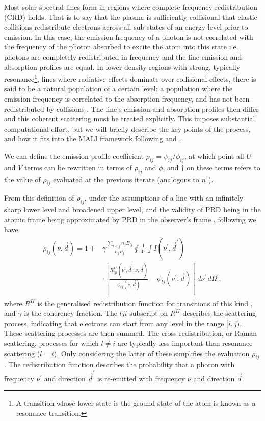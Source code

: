 Most solar spectral lines form in regions where complete frequency redistribution (CRD) holds.
That is to say that the plasma is sufficiently collisional that elastic collisions redistribute electrons across all sub-states of an energy level prior to emission.
In this case, the emission frequency of a photon is not correlated with the frequency of the photon absorbed to excite the atom into this state i.e. photons are completely redistributed in frequency and the line emission and absorption profiles are equal.
In lower density regions with strong, typically resonance\footnote{A transition whose lower state is the ground state of the atom is known as a resonance transition.}, lines where radiative effects dominate over collisional effects, there is said to be a natural population of a certain level: a population where the emission frequency is correlated to the absorption frequency, and has not been redistributed by collisions \citep{Hubeny2014}.
The line's emission and absorption profiles then differ and this coherent scattering must be treated explicitly.
This imposes substantial computational effort, but we will briefly describe the key points of the process, and how it fits into the MALI framework following \citet{Uitenbroek2001} and \citet{Hubeny2014}.

We can define the emission profile coefficient $\rho_{ij} = \psi_{ij} / \phi_{ij}$, at which point all $U$ and $V$ terms can be rewritten in terms of $\rho_{ij}$ and $\phi$, and $\dagger$ on these terms refers to the value of $\rho_{ij}$ evaluated at the previous iterate (analogous to $n^\dagger$).

From this definition of $\rho_{ij}$, under the assumptions of a line with an infinitely sharp lower level and broadened upper level, and the validity of PRD being in the atomic frame being approximated by PRD in the observer's frame \citep{Uitenbroek2001}, following \citet{Hubeny2014} we have
\begin{align}
\begin{split}
    \rho_{ij}(\nu, \vec{d}) = 1 + &\gamma\frac{\sum_{l < j}n_j B_{lj}}{n_j P_j} \oint\frac{1}{4\pi}\int I(\nu^\prime, \vec{d}^\prime) \\ &\cdot \left[ \frac{R^{II}_{lji}(\nu^\prime, \vec{d}^\prime; \nu, \vec{d})}{\phi_{ij}(\nu, \vec{d})} - \phi_{lj}(\nu^\prime, \vec{d}) \right]\,d\nu^\prime\,d\Omega^\prime,
\end{split}
\end{align}
where $R^{II}$ is the generalised redistribution function for transitions of this kind \citep{Hubeny1982}, and $\gamma$ is the coherency fraction.
The $lji$ subscript on $R^{II}$ describes the scattering process, indicating that electrons can start from any level in the range $[i, j)$.
These scattering processes are then summed.
The cross-redistribution, or Raman scattering, processes for which $l\neq i$ are typically less important than resonance scattering ($l = i$).
Only considering the latter of these simplifies the evaluation $\rho_{ij}$.
The redistribution function describes the probability that a photon with frequency $\nu^\prime$ and direction $\vec{d}^\prime$ is re-emitted with frequency $\nu$ and direction $\vec{d}$.

